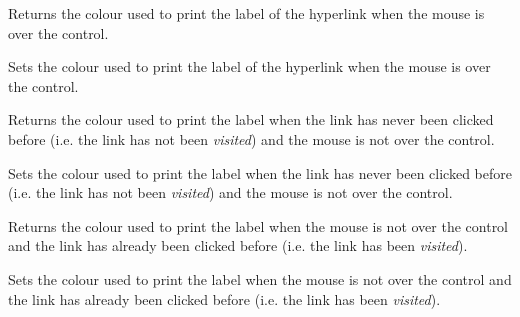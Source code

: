 



\label{wxhyperlinkctrlgethovercolour}


Returns the colour used to print the label of the hyperlink when the mouse is over the control.


\label{wxhyperlinkctrlsethovercolour}


Sets the colour used to print the label of the hyperlink when the mouse is over the control.


\label{wxhyperlinkctrlgetnormalcolour}


Returns the colour used to print the label when the link has never been clicked before
(i.e. the link has not been {\it visited}) and the mouse is not over the control.


\label{wxhyperlinkctrlsetnormalcolour}


Sets the colour used to print the label when the link has never been clicked before
(i.e. the link has not been {\it visited}) and the mouse is not over the control.


\label{wxhyperlinkctrlgetvisitedcolour}


Returns the colour used to print the label when the mouse is not over the control
and the link has already been clicked before (i.e. the link has been {\it visited}).


\label{wxhyperlinkctrlsetvisitedcolour}


Sets the colour used to print the label when the mouse is not over the control
and the link has already been clicked before (i.e. the link has been {\it visited}).


